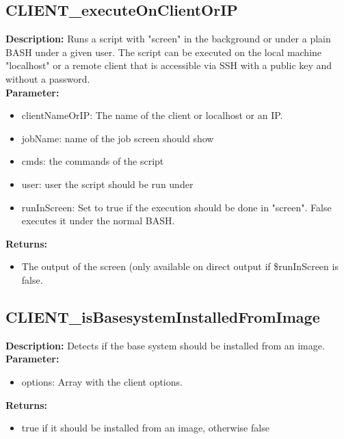 \subsection{CLIENT\_executeOnClientOrIP}
\textbf{Description:} Runs a script with "screen" in the background or under a plain BASH under a given user. The script can be executed on the local machine "localhost" or a remote client that is accessible via SSH with a public key and without a password.\\
\textbf{Parameter:}
\begin{itemize}
\item clientNameOrIP: The name of the client or localhost or an IP.
\item jobName: name of the job screen should show
\item cmds: the commands of the script 
\item user: user the script should be run under
\item runInScreen: Set to true if the execution should be done in "screen". False executes it under the normal BASH.
\end{itemize}
\textbf{Returns:}
\begin{itemize}
\item The output of the screen (only available on direct output if \$runInScreen is false.
\end{itemize}

\subsection{CLIENT\_isBasesystemInstalledFromImage}
\textbf{Description:} Detects if the base system should be installed from an image.\\
\textbf{Parameter:}
\begin{itemize}
\item options: Array with the client options.
\end{itemize}
\textbf{Returns:}
\begin{itemize}
\item true if it should be installed from an image, otherwise false
\end{itemize}

